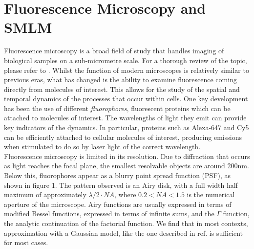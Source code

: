 \documentclass[11pt]{article}
\begin{document}
\section{Fluorescence Microscopy and SMLM}
Fluorescence microscopy is a broad field of study that handles imaging of biological samples on a sub-micrometre scale. For a thorough review of the topic, please refer to \cite{combs2017current, pFrenchReview}. Whilst the function of modern microscopes is relatively similar to previous eras, what has changed is the ability to examine fluorescence coming directly from molecules of interest. This allows for the study of the spatial and temporal dynamics of the processes that occur within cells. One key development has been the use of different \textit{fluorophores}, fluorescent proteins which can be attached to molecules of interest. The wavelengths of light they emit can provide key indicators of the dynamics. In particular, proteins such as Alexa-647 and Cy5 can be efficiently attached to cellular molecules of interest, producing emissions when stimulated to do so by laser light of the correct wavelength.\\

Fluorescence microscopy is limited in its resolution. Due to diffraction that occurs as light reaches the focal plane, the smallest resolvable objects are around 200nm. Below this, fluorophores appear as a blurry point spread function (PSF), as shown in figure 1. The pattern observed is an Airy disk, with a full width half maximum of approximately $\lambda / 2\cdot NA$, where $0.2 < NA < 1.5$ is the numerical aperture of the microscope\cite{pFrenchReview}.  Airy functions are usually expressed in terms of modified Bessel functions, expressed in terms of infinite sums, and the $\Gamma$ function, the analytic continuation of the factorial function. We find that in most contexts, approximation with a Gaussian model, like the one described in ref. \cite{SCHOWENGERDT200775} is sufficient for most cases. \\
\end{document}
